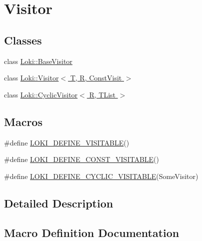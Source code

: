 \hypertarget{group__VisitorGroup}{}\section{Visitor}
\label{group__VisitorGroup}
\subsection*{Classes}
\begin{DoxyCompactItemize}
\item 
class \hyperlink{classLoki_1_1BaseVisitor}{Loki\+::\+Base\+Visitor}
\item 
class \hyperlink{classLoki_1_1Visitor}{Loki\+::\+Visitor$<$ T, R, Const\+Visit $>$}
\item 
class \hyperlink{classLoki_1_1CyclicVisitor}{Loki\+::\+Cyclic\+Visitor$<$ R, T\+List $>$}
\end{DoxyCompactItemize}
\subsection*{Macros}
\begin{DoxyCompactItemize}
\item 
\#define \hyperlink{group__VisitorGroup_ga2b6ed280714eca44a2713d3cee5b2093}{L\+O\+K\+I\+\_\+\+D\+E\+F\+I\+N\+E\+\_\+\+V\+I\+S\+I\+T\+A\+B\+L\+E}()
\item 
\#define \hyperlink{group__VisitorGroup_ga0d60fea385397a82b9d3b3d231517777}{L\+O\+K\+I\+\_\+\+D\+E\+F\+I\+N\+E\+\_\+\+C\+O\+N\+S\+T\+\_\+\+V\+I\+S\+I\+T\+A\+B\+L\+E}()
\item 
\#define \hyperlink{group__VisitorGroup_gab976a68573455c07def553bdc34203f7}{L\+O\+K\+I\+\_\+\+D\+E\+F\+I\+N\+E\+\_\+\+C\+Y\+C\+L\+I\+C\+\_\+\+V\+I\+S\+I\+T\+A\+B\+L\+E}(Some\+Visitor)
\end{DoxyCompactItemize}


\subsection{Detailed Description}


\subsection{Macro Definition Documentation}
\hypertarget{group__VisitorGroup_ga0d60fea385397a82b9d3b3d231517777}{}
